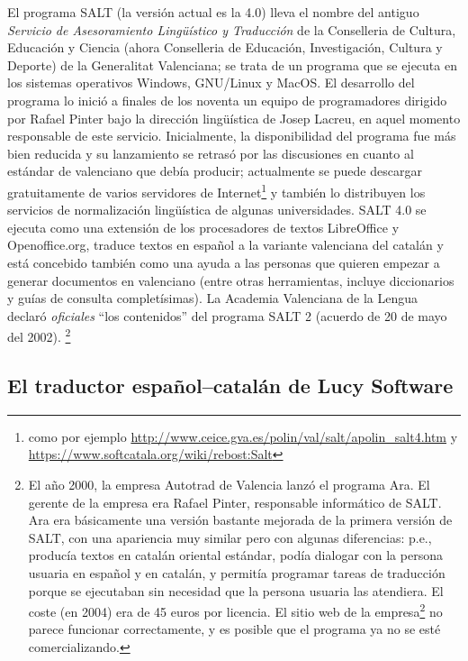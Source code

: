 El programa SALT (la versión actual es la 4.0) lleva el nombre del antiguo \emph{Servicio de Asesoramiento Lingüístico y Traducción} de la Conselleria de Cultura, Educación y Ciencia (ahora Conselleria de Educación, Investigación, Cultura y Deporte) de la Generalitat Valenciana; se trata de un programa que se ejecuta en los sistemas operativos Windows, GNU/Linux y MacOS. El desarrollo del programa lo inició a finales de los noventa un equipo de programadores dirigido por Rafael Pinter bajo la dirección lingüística de Josep Lacreu, en aquel momento responsable de este servicio. Inicialmente, la disponibilidad del programa fue más bien reducida y su lanzamiento se retrasó por las discusiones en cuanto al estándar de valenciano que debía producir; actualmente se puede descargar gratuitamente de varios servidores de Internet\footnote{como por ejemplo \url{http://www.ceice.gva.es/polin/val/salt/apolin_salt4.htm} y  \url{https://www.softcatala.org/wiki/rebost:Salt}} y también lo distribuyen los servicios de normalización lingüística de algunas universidades. SALT 4.0 se ejecuta como una extensión de los procesadores de textos LibreOffice y Openoffice.org, traduce textos en español a la variante valenciana del catalán y está concebido también como una ayuda a las personas que quieren empezar a generar documentos en valenciano (entre otras herramientas, incluye diccionarios y guías de consulta completísimas). La Academia Valenciana de la Lengua declaró \emph{oficiales} ``los contenidos'' del programa SALT 2 (acuerdo de 20 de mayo del 2002). \footnote{El año 2000, la empresa Autotrad de Valencia lanzó el programa Ara. El gerente de la empresa era Rafael Pinter, responsable informático de SALT. Ara era básicamente una versión bastante mejorada de la primera versión de SALT, con una apariencia muy similar pero con algunas diferencias: p.e., producía textos en catalán oriental estándar, podía dialogar con la persona usuaria en español y en catalán, y permitía programar tareas de traducción porque se ejecutaban sin necesidad que la persona usuaria las atendiera. El coste (en 2004) era de 45 euros por licencia. El sitio web de la empresa\footnote{\url{http://www.ara-autotrad.es}} no parece funcionar correctamente, y es posible que el programa ya no se esté comercializando.} 

\subsection{El traductor español--catalán de Lucy Software} 

